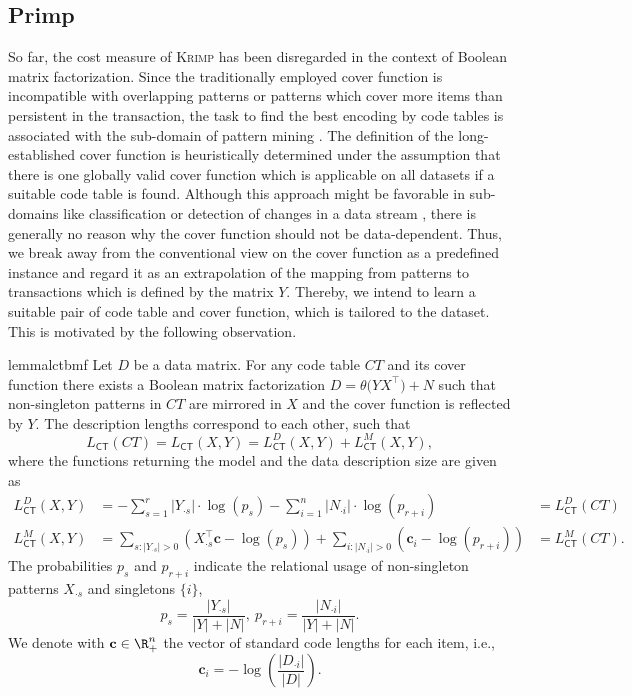\subsection{Primp}\label{sec:MDL:primp}
So far, the cost measure of \textsc{Krimp} has been disregarded in the context of Boolean matrix factorization. Since the traditionally employed cover function is incompatible with overlapping patterns or patterns which cover more items than persistent in the transaction, the task to find the best encoding by code tables is associated with the sub-domain of pattern mining \citep{miettinen2014mdl4bmf,lucchese2014unifying,karaev2015getting}. The definition of the long-established cover function is heuristically determined under the assumption that there is one globally valid cover function which is applicable on all datasets if a suitable code table is found. Although this approach might be favorable in sub-domains like classification or detection of changes in a data stream \citep{vreeken2011krimp,van2008streamkrimp}, there is generally no reason why the cover function should not be data-dependent.  
Thus, we break away from the conventional view on the cover function as a predefined instance and regard it as an extrapolation of the mapping from patterns to transactions which is defined by the matrix $Y$. Thereby, we intend to learn a suitable pair of code table and cover function, which is tailored to the dataset. This is motivated by the following observation.
\begin{restatable}{lemma}{lctbmf}\label{thm:CTBMF}
Let $D$ be a data matrix. For any code table $CT$ and its cover function there exists a Boolean matrix factorization $D=\theta\bigl(YX^\top\bigr)+N$ such that non-singleton patterns in $CT$ are mirrored in $X$ and the cover function is reflected by $Y$. The description lengths correspond to each other, such that 
\[L_{\mathsf{CT}}(CT)=L_{\mathsf{CT}}(X,Y)=L_{\mathsf{CT}}^D(X,Y)+L_{\mathsf{CT}}^M(X,Y),\]
where the functions returning the model and the data description size are given as  
\begin{align*}
	L_{\mathsf{CT}}^D(X,Y)&=-\sum_{s=1}^r \lvert Y_{\cdot s}\rvert  \cdot \log(p_s)
       -\sum_{i=1}^n \lvert N_{\cdot i}\rvert  \cdot \log(p_{r+i})
       &=L^D_{\mathsf{CT}}(CT)\\
    L_{\mathsf{CT}}^M(X,Y)
    &=\sum_{s:\lvert Y_{\cdot s}\rvert > 0}\left(X_{\cdot s}^\top \mathbf{c}-\log(p_s)\right)
	+\sum_{i:\lvert N_{\cdot i}\rvert > 0}\left(\mathbf{c}_i-\log(p_{r+i})\right)&=L_{\mathsf{CT}}^M(CT).
\end{align*}
The probabilities $p_s$ and $p_{r+i}$ indicate the relational usage of non-singleton patterns $X_{\cdot s}$ and singletons $\{i\}$,
\[
	p_s = \frac{\lvert Y_{\cdot s}\rvert }{\lvert Y\rvert +\lvert N\rvert },\  p_{r+i} = \frac{\lvert N_{\cdot i}\rvert }{\lvert Y\rvert +\lvert N\rvert }.
\]
We denote with $\mathbf{c}\in\R_+^n$ the vector of standard code lengths for each item, i.e., 
\[\mathbf{c}_i=-\log\left(\frac{\lvert D_{\cdot i}\rvert }{\lvert D\lvert }\right).\]
\end{restatable}
